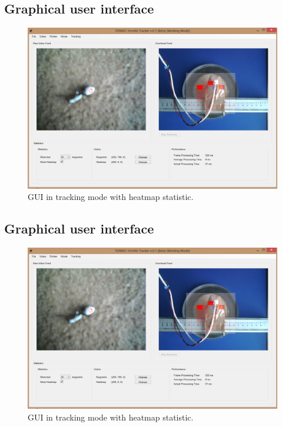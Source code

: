 
\subsection{Graphical user interface}
\begin{figure}[ht!]
  \centering
    \includegraphics[scale=0.25]{img/HeatmapGUI}
  \caption{GUI in tracking mode with heatmap statistic.}
  \label{fig:gui_heat}
\end{figure}

\subsection{Graphical user interface}
\begin{figure}[ht!]
  \centering
    \includegraphics[scale=0.25]{img/HeatmapGUI}
  \caption{GUI in tracking mode with heatmap statistic.}
  \label{fig:gui_thresh}
\end{figure}

